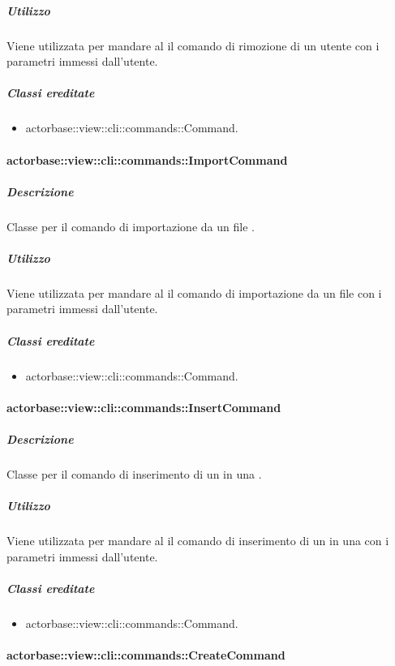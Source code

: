 \documentclass{scalatekids-article}
\begin{document}
\subparagraph{Utilizzo}

Viene utilizzata per mandare al  il comando di rimozione di un utente con i parametri immessi dall'utente.

\subparagraph{Classi ereditate}

\begin{itemize}
\item actorbase::view::cli::commands::Command.
\end{itemize}

\paragraph{actorbase::view::cli::commands::ImportCommand}

\subparagraph{Descrizione}

Classe per il comando di importazione da un file .

\subparagraph{Utilizzo}

Viene utilizzata per mandare al  il comando di importazione da un file  con i parametri immessi dall'utente.

\subparagraph{Classi ereditate}

\begin{itemize}
\item actorbase::view::cli::commands::Command.
\end{itemize}

\paragraph{actorbase::view::cli::commands::InsertCommand}

\subparagraph{Descrizione}

Classe per il comando di inserimento di un  in una .

\subparagraph{Utilizzo}

Viene utilizzata per mandare al  il comando di inserimento di un  in una  con i parametri immessi dall'utente.

\subparagraph{Classi ereditate}

\begin{itemize}
\item actorbase::view::cli::commands::Command.
\end{itemize}

\paragraph{actorbase::view::cli::commands::CreateCommand}
\end{document}
